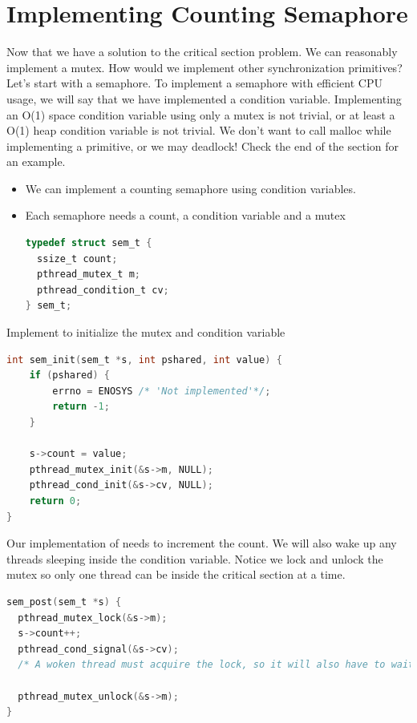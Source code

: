 \section{Implementing Counting Semaphore}

Now that we have a solution to the critical section problem.
We can reasonably implement a mutex.
How would we implement other synchronization primitives?
Let's start with a semaphore.
To implement a semaphore with efficient CPU usage, we will say that we have implemented a condition variable.
Implementing an O(1) space condition variable using only a mutex is not trivial, or at least a O(1) heap condition variable is not trivial.
We don't want to call malloc while implementing a primitive, or we may deadlock!
Check the end of the section for an example.

\begin{itemize}
\item
  We can implement a counting semaphore using condition variables.
\item
  Each semaphore needs a count, a condition variable and a mutex
\begin{lstlisting}[language=C]
typedef struct sem_t {
  ssize_t count;
  pthread_mutex_t m;
  pthread_condition_t cv;
} sem_t;
\end{lstlisting}
\end{itemize}

Implement  to initialize the mutex and condition variable

\begin{lstlisting}[language=C]
int sem_init(sem_t *s, int pshared, int value) {
    if (pshared) {
        errno = ENOSYS /* 'Not implemented'*/;
        return -1;
    }

    s->count = value;
    pthread_mutex_init(&s->m, NULL);
    pthread_cond_init(&s->cv, NULL);
    return 0;
}
\end{lstlisting}

Our implementation of  needs to increment the count.
We will also wake up any threads sleeping inside the condition variable.
Notice we lock and unlock the mutex so only one thread can be inside the critical section at a time.

\begin{lstlisting}[language=C]
sem_post(sem_t *s) {
  pthread_mutex_lock(&s->m);
  s->count++;
  pthread_cond_signal(&s->cv);
  /* A woken thread must acquire the lock, so it will also have to wait until we call unlock*/

  pthread_mutex_unlock(&s->m);
}
\end{lstlisting}

